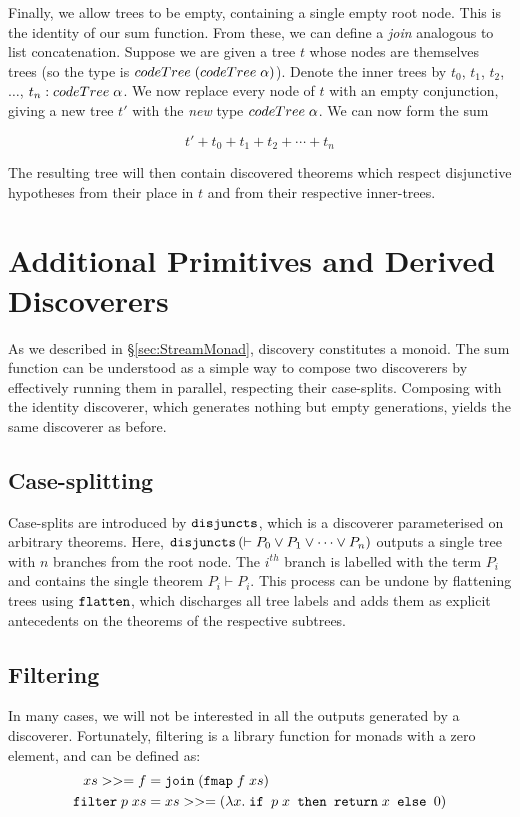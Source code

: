 Finally, we allow trees to be empty, containing a single empty root node. This is the identity of our sum function. From these, we can define a \emph{join} analogous to list concatenation. Suppose we are given a tree $t$ whose nodes are themselves trees (so the type is $\\code{Tree}\;(\\code{Tree}\; \alpha)$). Denote the inner trees by $t_0$, $t_1$, $t_2$, $\ldots$, $t_n : \\code{Tree}\;\alpha$. We now replace every node of $t$ with an empty conjunction, giving a new tree $t'$ with the \emph{new} type $\\code{Tree}\;\alpha$. We can now form the sum 

\begin{displaymath}
t' + t_0 + t_1 + t_2 + \cdots + t_n
\end{displaymath}

The resulting tree will then contain discovered theorems which respect disjunctive hypotheses from their place in $t$ and from their respective inner-trees.

\section{Additional Primitives and Derived Discoverers}\label{sec:Additional}
As we described in \S\ref{sec:StreamMonad}, discovery constitutes a monoid. The sum function can be understood as a simple way to compose two discoverers by effectively running them in parallel, respecting their case-splits. Composing with the identity discoverer, which generates nothing but empty generations, yields the same discoverer as before.

\subsection{Case-splitting}
Case-splits are introduced by $\texttt{disjuncts}$, which is a discoverer parameterised on arbitrary theorems. Here, $\texttt{disjuncts}\left(\vdash P_0 \vee P_1 \vee \cdots \vee P_n\right)$ outputs a single tree with $n$ branches from the root node. The $i^{th}$ branch is labelled with the term $P_i$ and contains the single theorem $P_i \vdash P_i$. This process can be undone by flattening trees using $\texttt{flatten}$, which discharges all tree labels and adds them as explicit antecedents on the theorems of the respective subtrees. 

\subsection{Filtering}
In many cases, we will not be interested in all the outputs generated by a discoverer. Fortunately, filtering is a library function for monads with a zero element, and can be defined as:
\begin{align*}
xs >>= f &= \texttt{join}\;(\texttt{fmap}\;f\;xs) \\
\texttt{filter}\;p\;xs &= xs >>= (\lambda x.\;\texttt{if } p\;x \texttt{ then } \texttt{return}\;x \texttt { else } 0)
\end{align*}

